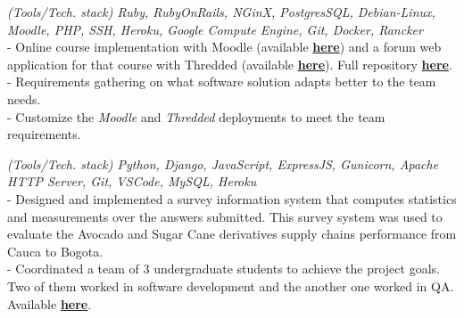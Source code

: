 \documentclass[]{CV-JuanCamiloFlorez}
\begin{document}
\begin{minipage}[t]{0.66\textwidth}
    \noindent
    \focusareas{}
    \textit{(Tools/Tech. stack) Ruby, RubyOnRails, NGinX, PostgresSQL, Debian-Linux, Moodle, PHP, SSH, Heroku, Google Compute Engine, Git, Docker, Rancker} \\
        - Online course implementation with Moodle (available \textbf{\href{https://gitlab.com/VanJFlorez/animal-modeling-ethics/tree/master/docs/4 LMS build}{here}}) and a forum web application for that course with Thredded (available \textbf{\href{https://gitlab.com/VanJFlorez/animal-modeling-ethics/blob/master/docs/3\%20Social\%20WebApp/CP\%20etica\%20animal\%20webApp.pdf}{here}}). Full repository \textbf{\href{https://gitlab.com/VanJFlorez/animal-modeling-ethics/}{here}}. \\
        - Requirements gathering on what software solution adapts better to the team needs. \\
        - Customize the \textit{Moodle} and \textit{Thredded} deployments to meet the team requirements. \\
        \sectionsep

    \noindent
    \focusareas{}
    \textit{(Tools/Tech. stack) Python, Django, JavaScript, ExpressJS, Gunicorn, Apache HTTP Server, Git, VSCode, MySQL, Heroku} \\
        - Designed and implemented a survey information system that computes statistics and measurements over the answers submitted. This survey system was used to evaluate the Avocado and Sugar Cane derivatives supply chains performance from Cauca to Bogota. \\
        - Coordinated a team of 3 undergraduate students to achieve the project goals. Two of them worked in software development and the another one worked in QA. Available \textbf{\href{https://gitlab.com/VanJFlorez/sepro-webapp}{here}}. \\
        \sectionsep

 
\vspace{\topsep} %




\end{minipage}
\end{document}
